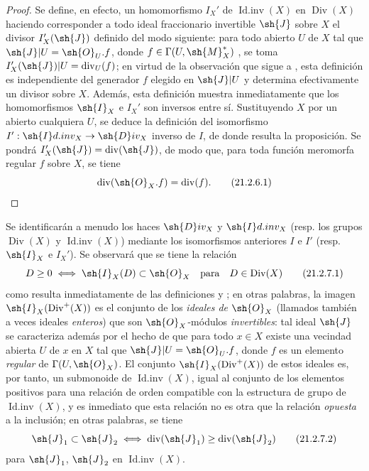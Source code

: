\begin{proof}
Se define, en efecto, un homomorfismo $I_X'$ de $\operatorname{Id.inv}(X)$ en $\operatorname{Div}(X)$ haciendo corresponder a todo ideal fraccionario invertible $\sh{J}$ sobre $X$ el divisor $I_X'(\sh{J})$ definido del modo siguiente: para todo abierto $U$ de $X$ tal que $\sh{J}|U=\sh{O}_U.f$, donde $f\in\Gamma(U,\sh{M}_X^*)$ , se toma $I_X'(\sh{J})|U=\operatorname{div}_U(f)$;
en virtud de la observación que sigue a , esta definición es independiente del generador $f$ elegido en $\sh{J}|U$ y determina efectivamente un divisor sobre $X$.
Además, esta definición muestra inmediatamente que los homomorfismos $\sh{I}_X$ e $I_X'$ son inversos entre sí.
Sustituyendo $X$ por un abierto cualquiera $U$, se deduce la definición del isomorfismo $I':\sh{I}d.inv_X\to\sh{D}iv_X$ inverso de $I$, de donde resulta la proposición.
Se pondrá $I_X'(\sh{J})=\operatorname{div}(\sh{J})$, de modo que, para toda función meromorfa regular $f$ sobre $X$, se tiene
\[
\label{IV.21.2.6.1}
  \operatorname{div}(\sh{O}_X.f)=\operatorname{div}(f).
  \tag{21.2.6.1}
\]
\end{proof}

\begin{env}[21.2.7]
\label{IV.21.2.7}
Se identificarán a menudo los haces $\sh{D}iv_X$ y $\sh{I}d.inv_X$ (resp. los grupos $\operatorname{Div}(X)$ y $\operatorname{Id.inv}(X)$) mediante los isomorfismos anteriores $I$ e $I'$ (resp. $\sh{I}_X$ e $I_X'$).
Se observará que se tiene la relación
\[
\label{IV.21.2.7.1}
  D\geq0 \iff \sh{I}_X(D)\subset\sh{O}_X \quad\text{para}\quad D\in\operatorname{Div}(X)
  \tag{21.2.7.1}
\]
como resulta inmediatamente de las definiciones  y ;
en otras palabras, la imagen $\sh{I}_X(\operatorname{Div}^+(X))$ es el conjunto de los \emph{ideales de} $\sh{O}_X$ (llamados también a veces ideales \emph{enteros}) que son $\sh{O}_X$-módulos \emph{invertibles}: tal ideal $\sh{J}$ se caracteriza además por el hecho de que para todo $x\in X$ existe una vecindad abierta $U$ de $x$ en $X$ tal que $\sh{J}|U=\sh{O}_U.f$, donde $f$ es un elemento \emph{regular} de $\Gamma(U,\sh{O}_X)$.
El conjunto $\sh{I}_X(\operatorname{Div}^+(X))$ de estos ideales es, por tanto, un submonoide de $\operatorname{Id.inv}(X)$, igual al conjunto de los elementos positivos para una relación de orden compatible con la estructura de grupo de $\operatorname{Id.inv}(X)$, y es inmediato que esta relación no es otra que la relación \emph{opuesta} a la inclusión;
en otras palabras, se tiene
\[
\label{IV.21.2.7.2}
  \sh{J}_1\subset\sh{J}_2 \iff \operatorname{div}(\sh{J}_1)\geq\operatorname{div}(\sh{J}_2)
  \tag{21.2.7.2}
\]
para $\sh{J}_1$, $\sh{J}_2$ en $\operatorname{Id.inv}(X)$.
\end{env}

